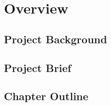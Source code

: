 
\chapter{Overview}
\label{Chapter1}


\section{Project Background}


\section{Project Brief}


\section{Chapter Outline}

